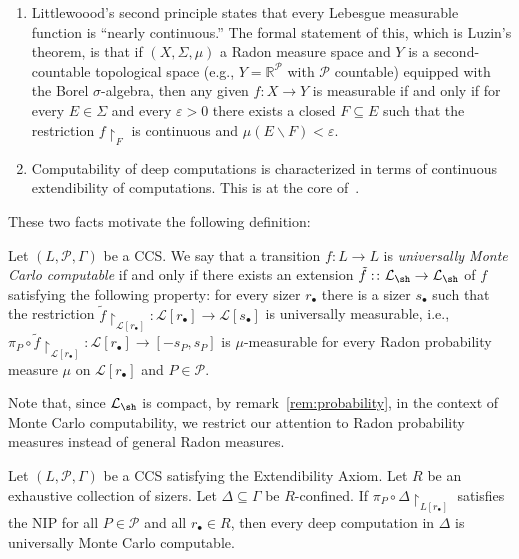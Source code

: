 \begin{enumerate}
    \item Littlewoood's second principle states that every Lebesgue measurable function is ``nearly continuous.''
The formal statement of this, which is Luzin's theorem, is that if $(X,\Sigma ,\mu )$ a Radon measure space and $Y$ is a second-countable topological space (e.g., $Y=\mathbb{R}^\mathcal{P}$ with $\mathcal{P}$ countable) equipped with the Borel $\sigma$-algebra, then any given $f:X\to Y$ is measurable if and only if for every $E\in\Sigma$ and every $\varepsilon>0$ there exists a closed $F\subseteq E$ such that the restriction $f\restriction_F$ is continuous and $\mu(E\backslash F) < \varepsilon$.

    \item Computability of deep computations is characterized in terms of continuous extendibility of computations.
    This is at the core of~\cite{alva2024approximability}.
\end{enumerate}

These two facts motivate the following definition:

\begin{definition}\label{def:universally-essentially-computable}
    Let $(L,\mathcal{P},\Gamma)$ be a CCS.
    We say that a transition $f\colon L\to L$ is \emph{universally Monte Carlo computable} if and only if there exists an extension $\tilde f:\colon\mathcal{L}_{\sh}\to \mathcal{L}_{\sh}$ of $f$ satisfying the following property: for every sizer $r_\bullet$ there is a sizer $s_\bullet$ such that the restriction $\tilde f\restriction_{\mathcal{L}[r_{\bullet}]}\colon\mathcal{L}[r_\bullet]\to\mathcal{L}[s_\bullet]$ is universally measurable, i.e., $\pi_P\circ \tilde f\restriction_{\mathcal{L}[r_{\bullet}]}\colon \mathcal{L}[r_\bullet]\to [-s_P,s_P]$ is $\mu$-measurable for every Radon probability measure $\mu$ on $\mathcal{L}[r_\bullet]$ and $P\in\mathcal{P}$.
\end{definition}

Note that, since $\mathcal{L}_{\sh}$ is compact, by remark~\ref{rem:probability}, in the context of Monte Carlo computability, we restrict our attention to Radon probability measures instead of general Radon measures.

\begin{theorem}\label{thm:NIP-Monte-Carlo}
    Let $(L,\mathcal{P},\Gamma)$ be a CCS satisfying the Extendibility Axiom.
    Let $R$ be an exhaustive collection of sizers.
    Let $\Delta\subseteq\Gamma$ be $R$-confined.
    If $\pi_P\circ\Delta\restriction_{L[r_\bullet]}$ satisfies the NIP for all $P\in\mathcal{P}$ and all $r_{\bullet}\in R$, then every deep computation in $\Delta$ is universally Monte Carlo computable.
\end{theorem}

